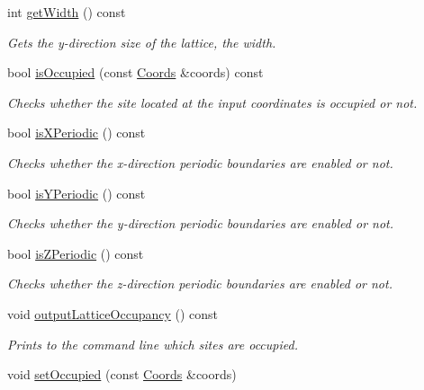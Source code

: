 \begin{DoxyCompactItemize}
int \hyperlink{class_lattice_aeb60d2b8bfb02d9da8bef463f0d41428}{get\+Width} () const
\begin{DoxyCompactList}\small\item\em Gets the y-\/direction size of the lattice, the width. \end{DoxyCompactList}\item 
bool \hyperlink{class_lattice_a4d37afb6ad4c67f4f6462c2f6d5c337d}{is\+Occupied} (const \hyperlink{struct_coords}{Coords} \&coords) const
\begin{DoxyCompactList}\small\item\em Checks whether the site located at the input coordinates is occupied or not. \end{DoxyCompactList}\item 
bool \hyperlink{class_lattice_accf3b995e0d0cb422907728a29b1b523}{is\+X\+Periodic} () const
\begin{DoxyCompactList}\small\item\em Checks whether the x-\/direction periodic boundaries are enabled or not. \end{DoxyCompactList}\item 
bool \hyperlink{class_lattice_ac3192acefb019c5258143a6c758b3e48}{is\+Y\+Periodic} () const
\begin{DoxyCompactList}\small\item\em Checks whether the y-\/direction periodic boundaries are enabled or not. \end{DoxyCompactList}\item 
bool \hyperlink{class_lattice_ad7dd1b12a253e506aba5cedb57bf86ea}{is\+Z\+Periodic} () const
\begin{DoxyCompactList}\small\item\em Checks whether the z-\/direction periodic boundaries are enabled or not. \end{DoxyCompactList}\item 
\mbox{\label{class_lattice_aa1f65735ecbd750ec04b6413b4d47316}} 
void \hyperlink{class_lattice_aa1f65735ecbd750ec04b6413b4d47316}{output\+Lattice\+Occupancy} () const
\begin{DoxyCompactList}\small\item\em Prints to the command line which sites are occupied. \end{DoxyCompactList}\item 
void \hyperlink{class_lattice_a515b8bc548ef4a87c3495a7352a60399}{set\+Occupied} (const \hyperlink{struct_coords}{Coords} \&coords)

\end{DoxyCompactItemize}
